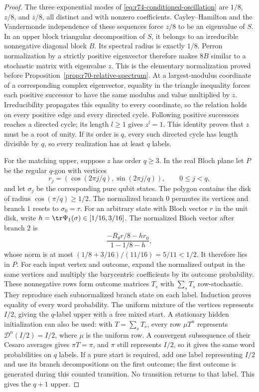 \begin{proof}
The three exponential modes of \eqref{eq:r74-conditioned-oscillation}
are $1/8$, $z/8$, and $\overline z/8$, all distinct and with nonzero
coefficients. Cayley--Hamilton and the Vandermonde independence of these
sequences force $z/8$ to be an eigenvalue of $S$. In an upper block
triangular decomposition of $S$, it belongs to an irreducible nonnegative
diagonal block $B$. Its spectral radius is exactly $1/8$. Perron
normalization by a strictly positive eigenvector therefore makes $8B$
similar to a stochastic matrix with eigenvalue $z$. This is the elementary
normalization proved before Proposition~\ref{prop:r70-relative-spectrum}.
At a largest-modulus coordinate of a corresponding complex eigenvector,
equality in the triangle inequality forces each positive successor to have
the same modulus and value multiplied by $z$. Irreducibility propagates this
equality to every coordinate, so the relation holds on every positive edge
and every directed cycle. Following positive successors
reaches a directed cycle; its length $l\ge1$ gives $z^l=1$. This
identity proves that $z$ must be a root of unity. If its order is $q$,
every such directed cycle has length divisible by $q$, so every
realization has at least $q$ labels.

For the matching upper, suppose $z$ has order $q\ge3$. In the real Bloch
plane let $P$ be the regular $q$-gon with vertices
\[
 r_j=(\cos(2\pi j/q),\sin(2\pi j/q)),\qquad 0\le j<q,
\]
and let $\sigma_j$ be the corresponding pure qubit states. The polygon
contains the disk of radius $\cos(\pi/q)\ge1/2$. The normalized branch
$0$ permutes its vertices and branch $1$ resets to $\sigma_0=\tau$.
For an arbitrary state with Bloch vector $r$ in the unit disk, write
$h=\tr\Psi_1(\sigma)\in[1/16,3/16]$. The normalized Bloch vector after
branch $2$ is
\[
 \frac{-R_\theta r/8-h r_0}{1-1/8-h},
\]
whose norm is at most $(1/8+3/16)/(11/16)=5/11<1/2$. It therefore lies
in $P$. For each input vertex and outcome, expand the normalized output in
the same vertices and multiply the barycentric coefficients by its outcome
probability. These nonnegative rows form outcome matrices $T_s$ with
$\sum_sT_s$ row-stochastic. They reproduce each subnormalized branch
state on each label. Induction proves equality of every word probability.
The uniform mixture of the vertices represents $I/2$, giving the
$q$-label upper with a free mixed start. A stationary hidden initialization
can also be used: with $T=\sum_sT_s$, every row $\mu T^n$ represents
$\mathcal D^n(I/2)=I/2$, where $\mu$ is the uniform row. A convergent
subsequence of their Cesaro averages gives $\pi T=\pi$, and $\pi$ still
represents $I/2$, so it gives the same word probabilities on $q$ labels.
If a pure start is required, add
one label representing $I/2$ and use its branch decompositions on the first
outcome; the first outcome is generated during this counted transition.
No transition returns to that label. This gives the $q+1$ upper.


\end{proof}
